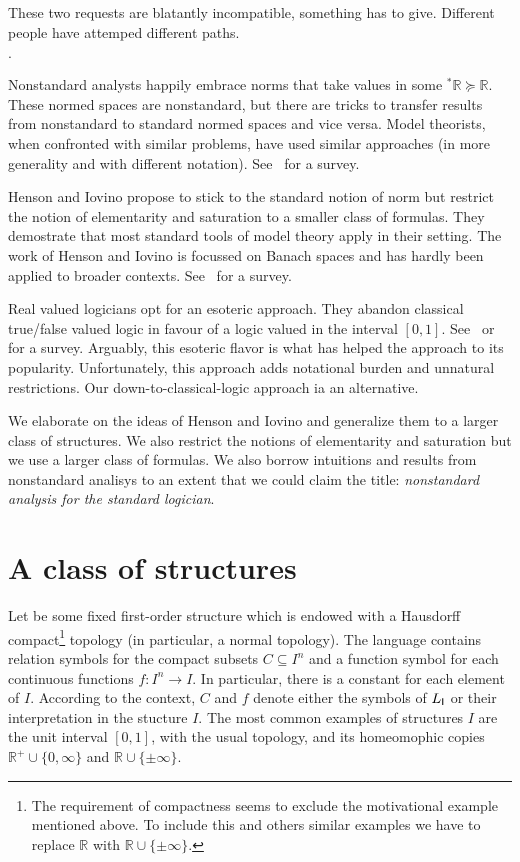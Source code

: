 \documentclass[10pt,oneside]{amsproc}
\newcommand{\mylabel}[1]{{#1}\hfill}
\renewenvironment{itemize}
  {\begin{list}{$\cdot$}{%
  \setlength{\parskip}{0mm}
  \setlength{\topsep}{.4\baselineskip}
  \setlength{\rightmargin}{0mm}
  \setlength{\listparindent}{0mm}
  \setlength{\itemindent}{0mm}
  \setlength{\labelwidth}{3ex}
  \setlength{\itemsep}{.2\baselineskip}
  \setlength{\parsep}{.2\baselineskip}
  \setlength{\partopsep}{0mm}
  \setlength{\labelsep}{1ex}
  \setlength{\leftmargin}{\labelwidth+\labelsep}
  \let\makelabel\mylabel}}{%
\end{list}}
\renewcommand*{\emph}[1]{%
   \smash{\tikz[baseline]\node[rectangle, fill=teal!25, rounded corners, inner xsep=0.5ex, inner ysep=0.2ex, anchor=base, minimum height = 2.7ex]{\strut #1};}}
\begin{document}
These two requests are blatantly incompatible, something has to give.
Different people have attemped different paths.
\begin{itemize}
  \item[1.] Nonstandard analysts happily embrace norms that take values in some ${}^*\mathds{R}\succeq\mathds{R}$.
  These normed spaces are nonstandard, but there are tricks to transfer results from nonstandard to standard normed spaces and vice versa.
  Model theorists, when confronted with similar problems, have used similar approaches (in more generality and with different notation). See~\cite{G} for a survey.
  \item[2.] Henson and Iovino propose to stick to the standard notion of norm but restrict the notion of elementarity and saturation to a smaller class of formulas.
  They demostrate that most standard tools of model theory apply in their setting. 
  The work of Henson and Iovino is focussed on Banach spaces and has hardly been applied to broader contexts. See~\cite{HI} for a survey.
  \item[3.] Real valued logicians opt for an esoteric approach.
  They abandon classical true/false valued logic in favour of a logic valued in the interval $[0,1]$.
  See~\cite{K} or~\cite{H} for a survey.
  Arguably, this esoteric flavor is what has helped the approach to its popularity. 
  Unfortunately, this approach adds notational burden and unnatural restrictions.
  Our down-to-classical-logic approach ia an alternative.
\end{itemize}

We elaborate on the ideas of Henson and Iovino and generalize them to a larger class of structures.
We also restrict the notions of elementarity and saturation but we use a larger class of formulas.
We also borrow intuitions and results from nonstandard analisys to an extent that we could claim the title: \textit{nonstandard analysis for the standard logician}.


\section{A class of structures}\label{uno}


Let \emph{$I$\/} be some fixed first-order structure which is endowed with a Hausdorff compact\footnote{The requirement of compactness seems to exclude the motivational example mentioned above. To include this and others similar examples we have to replace $\mathds{R}$ with $\mathds{R}\cup\{\pm\infty\}$.} topology (in particular, a normal topology).
The language \emph{$L_{\sf I}$\/} contains relation symbols for the compact subsets $C\subseteq I^n$ and a function symbol for each continuous functions $f:I^n\to I$.
In particular, there is a constant for each element of $I$.
According to the context, $C$ and $f$ denote either the symbols of $L_{\sf I}$ or their interpretation in the stucture $I$.
The most common examples of structures $I$ are the unit interval $[0,1]$, with the usual topology, and its homeomophic copies $\mathds{R}^+\cup\{0,\infty\}$ and $\mathds{R}\cup\{\pm\infty\}$.
\end{document}
